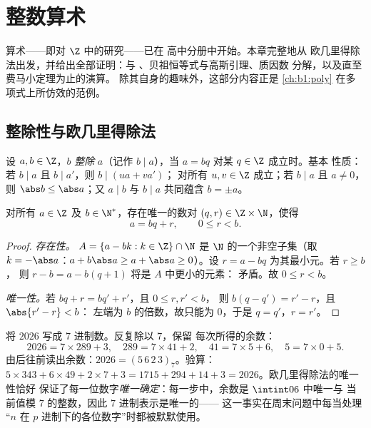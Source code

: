 \chapter{整数算术}\label{ch:b1:arith}

算术——即对 $\Z$ 中的研究——已在
高中分册中开始。本章完整地从
欧几里得除法出发，并给出全部证明：与
、贝祖恒等式与高斯引理、质因数
分解，以及直至费马小定理为止的演算。
除其自身的趣味外，这部分内容正是
\cref{ch:b1:poly} 在多项式上所仿效的范例。

\section{整除性与欧几里得除法}

\begin{definition}[整除性]\label{def:b1:arith:divides}
设 $a, b \in \Z$，$b$ \emph{整除} $a$（记作 $b \mid
a$），当 $a = bq$ 对某 $q \in \Z$ 成立时。基本
性质：若 $b \mid a$ 且 $b \mid a'$，则 $b \mid (ua + va')$；
对所有 $u, v \in \Z$ 成立；若 $b \mid a$ 且 $a \neq 0$，则 $\abs b \leq
\abs a$；又 $a \mid b$ 与 $b \mid a$ 共同蕴含 $b = \pm a$。
\end{definition}

\begin{theorem}[欧几里得除法]\label{thm:b1:arith:division}
对所有 $a \in \Z$ 及 $b \in \N^*$，存在唯一的数对 $(q, r)
\in \Z \times \N$，使得
\[
a = bq + r, \qquad 0 \leq r < b .
\]
\end{theorem}

\begin{proof}
\emph{存在性。} $A = \{a - bk : k \in \Z\} \cap \N$ 是
$\N$ 的一个非空子集（取 $k = -\abs a$：$a + b\abs a \geq a +
\abs a \geq 0$）。设 $r = a - bq$ 为其最小元。若 $r \geq b$，
则 $r - b = a - b(q+1)$ 将是 $A$ 中更小的元素：
矛盾。故 $0 \leq r < b$。

\emph{唯一性。}若 $bq + r = bq' + r'$，且 $0 \leq r, r' < b$，
则 $b(q - q') = r' - r$，且 $\abs{r' - r} < b$：
左端为 $b$ 的倍数，故只能为 $0$，于是 $q = q'$，$r = r'$。
\end{proof}

\begin{example}[用反复除法进行位值记数]\label{ex:b1:arith:base7}
将 $2026$ 写成 $7$ 进制数。反复除以 $7$，保留
每次所得的余数：
\[
2026 = 7 \times 289 + 3, \quad
289 = 7 \times 41 + 2, \quad
41 = 7 \times 5 + 6, \quad
5 = 7 \times 0 + 5 .
\]
由后往前读出余数：$2026 =
(5\,6\,2\,3)_7$。验算：$5 \times 343 + 6 \times 49 + 2 \times 7
+ 3 = 1715 + 294 + 14 + 3 = 2026$。欧几里得除法的唯一性恰好
保证了每一位数字\emph{唯一确定}：每一步中，余数是
$\intint06$ 中唯一与
当前值模 $7$ 的整数，因此 $7$ 进制表示是唯一的——
这一事实在周末问题中每当处理
“$n$ 在 $p$ 进制下的各位数字”时都被默默使用。
\end{example}

